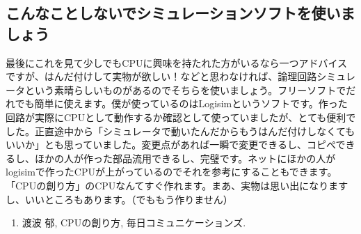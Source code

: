 \documentclass[11pt,b5paper,papersize,dvipdfmx]{jsbook}
\begin{document}
%
\subsection{こんなことしないでシミュレーションソフトを使いましょう}
最後にこれを見て少しでもCPUに興味を持たれた方がいるなら一つアドバイスですが、はんだ付けして実物が欲しい！などと思わなければ、論理回路シミュレータという素晴らしいものがあるのでそちらを使いましょう。フリーソフトでだれでも簡単に使えます。僕が使っているのはLogisimというソフトです。作った回路が実際にCPUとして動作するか確認として使っていましたが、とても便利でした。正直途中から「シミュレータで動いたんだからもうはんだ付けしなくてもいいか」とも思っていました。変更点があれば一瞬で変更できるし、コピぺできるし、ほかの人が作った部品流用できるし、完璧です。ネットにほかの人がlogisimで作ったCPUが上がっているのでそれを参考にすることもできます。「CPUの創り方」のCPUなんてすぐ作れます。まあ、実物は思い出になりますし、いいところもあります。（でももう作りません）

\sanko
\begin{enumerate}
\item 渡波 郁, CPUの創り方, 毎日コミュニケーションズ.
\end{enumerate}
\end{document}
